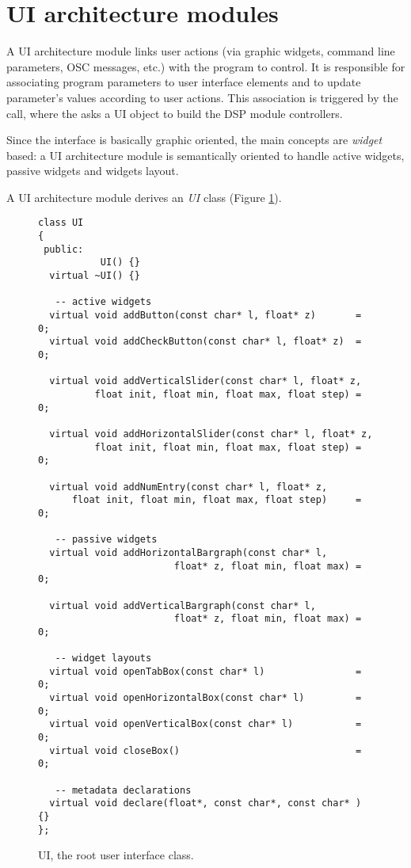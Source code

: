 \section{UI architecture modules} \label{sec:gui}

A UI architecture module links user actions (via graphic widgets, command line parameters, OSC messages, etc.) with the \faust program to control. 
It is responsible for associating program parameters to user interface elements and to update parameter's values according to user actions. This association is triggered by the  call, where the  asks a UI object to build the DSP module controllers.

Since the interface is basically graphic oriented, the main concepts are \emph{widget} based: a UI architecture module is semantically oriented to handle active widgets, passive widgets and widgets layout.

A \faust UI architecture module derives an \emph{UI} class (Figure \ref{tab:ui}). 

\begin{figure}[htdp]
\begin{center}
\begin{lstlisting}[basicstyle=\ttfamily\footnotesize\color{yotxt}]
class UI
{
 public:
           UI() {}
  virtual ~UI() {}

   -- active widgets
  virtual void addButton(const char* l, float* z)       = 0;
  virtual void addCheckButton(const char* l, float* z)  = 0;
  
  virtual void addVerticalSlider(const char* l, float* z, 
          float init, float min, float max, float step) = 0;
          
  virtual void addHorizontalSlider(const char* l, float* z, 
          float init, float min, float max, float step) = 0;
          
  virtual void addNumEntry(const char* l, float* z, 
      float init, float min, float max, float step)     = 0;
      
   -- passive widgets
  virtual void addHorizontalBargraph(const char* l,
                        float* z, float min, float max) = 0;
                        
  virtual void addVerticalBargraph(const char* l, 
                        float* z, float min, float max) = 0; 
                        
   -- widget layouts
  virtual void openTabBox(const char* l)                = 0;
  virtual void openHorizontalBox(const char* l)         = 0;
  virtual void openVerticalBox(const char* l)           = 0;
  virtual void closeBox()                               = 0;
        
   -- metadata declarations
  virtual void declare(float*, const char*, const char* ) {}
};
\end{lstlisting} 
\end{center}
\caption{UI, the root user interface class.}
\label{tab:ui}
\end{figure}

